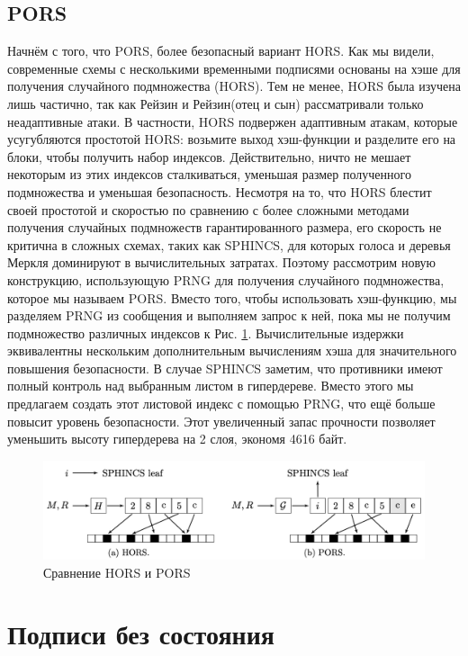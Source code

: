 \documentclass[a4paper, 14pt]{extarticle}
\begin{document}
\subsection{PORS}
Начнём с того, что PORS, более безопасный вариант HORS. Как мы видели, современные схемы с несколькими временными подписями основаны на хэше для получения случайного подмножества (HORS). Тем не менее, HORS была изучена лишь частично, так как Рейзин и Рейзин(отец и сын) рассматривали только неадаптивные атаки. В частности, HORS подвержен адаптивным атакам, которые усугубляются простотой HORS: возьмите выход хэш-функции и разделите его на блоки, чтобы получить набор индексов. Действительно, ничто не мешает некоторым из этих индексов сталкиваться, уменьшая размер полученного подмножества и уменьшая безопасность. Несмотря на то, что HORS блестит своей простотой и скоростью по сравнению с более сложными методами получения случайных подмножеств гарантированного размера, его скорость не критична в сложных схемах, таких как SPHINCS, для которых голоса и деревья Меркля доминируют в вычислительных затратах. Поэтому рассмотрим новую конструкцию, использующую PRNG для получения случайного подмножества, которое мы называем PORS. Вместо того, чтобы использовать хэш-функцию, мы разделяем PRNG из сообщения и выполняем запрос к ней, пока мы не получим подмножество различных индексов к Рис. \ref{fig:pors}. Вычислительные издержки эквивалентны нескольким дополнительным вычислениям хэша для значительного повышения безопасности. В случае SPHINCS заметим, что противники имеют полный контроль над выбранным листом в гипердереве. Вместо этого мы предлагаем создать этот листовой индекс с помощью PRNG, что ещё больше повысит уровень безопасности. Этот увеличенный запас прочности позволяет уменьшить высоту гипердерева на 2 слоя, экономя 4616 байт.

\begin{figure}[h]
    \centering
    \includegraphics[scale=0.85]{PORS.png}
    \caption{Сравнение HORS и PORS}
    \label{fig:pors}
\end{figure}
\newpage

\section{Подписи без состояния}
\end{document}
